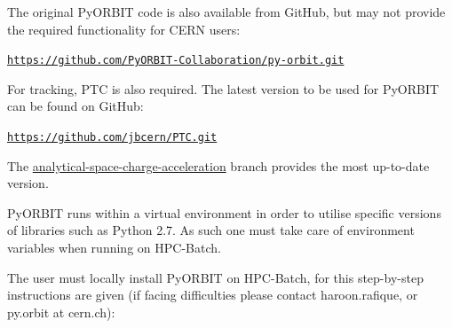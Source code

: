 \documentclass[a4paper]{cernatsnote}
\def \pyorbitgithub {\href{https://github.com/PyORBIT-Collaboration/py-orbit}{https://github.com/PyORBIT-Collaboration/py-orbit.git}}
\def \ptcgithub {\href{https://github.com/jbcern/PTC/tree/analytical-space-charge-acceleration}{https://github.com/jbcern/PTC.git}}
\begin{document}
The original PyORBIT code is also available from GitHub, but may not provide the required functionality for CERN users:

\texttt{\pyorbitgithub}

For tracking, PTC is also required. The latest version to be used for PyORBIT can be found on GitHub:

\texttt{\ptcgithub}

The \href{https://github.com/jbcern/PTC/tree/analytical-space-charge-acceleration}{analytical-space-charge-acceleration} branch provides the most up-to-date version.

PyORBIT runs within a virtual environment in order to utilise specific versions of libraries such as Python 2.7. As such one must take care of environment variables when running on HPC-Batch.

The user must locally install PyORBIT on HPC-Batch, for this step-by-step instructions are given (if facing difficulties please contact haroon.rafique, or py.orbit at cern.ch):
	
\end{document}
